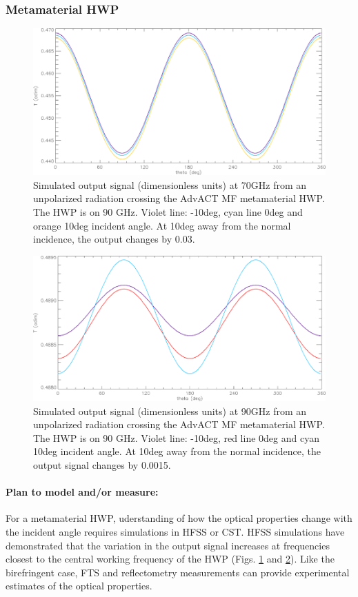 \subsubsection{Metamaterial HWP}

\begin{figure}
\centering
\includegraphics[width=0.6\linewidth]{figures/meta1.png}
\caption{Simulated output signal (dimensionless units) at 70GHz from an unpolarized radiation crossing the AdvACT MF metamaterial HWP. The HWP is %
on 90 GHz. Violet line: -10deg, cyan line 0deg and orange 10deg incident angle. At 10deg away from the normal incidence, the output %
changes by 0.03.}\label{meta1}
\end{figure}

\begin{figure}
\centering
\includegraphics[width=0.6\linewidth]{figures/meta2.png}
\caption{Simulated output signal (dimensionless units) at 90GHz from an unpolarized radiation crossing the AdvACT MF metamaterial HWP. The HWP is %
on 90 GHz. Violet line: -10deg, red line 0deg and cyan 10deg incident angle. At 10deg away from the normal incidence, the output signal
changes by 0.0015.}\label{meta2}
\end{figure}

\paragraph{Plan to model and/or measure:}
For a metamaterial HWP, uderstanding of how the optical properties change with the incident angle requires simulations in HFSS or CST. HFSS simulations have demonstrated that the variation in the output signal increases at frequencies closest to the central working frequency of the
HWP (Figs. \ref{meta1} and \ref{meta2}). 
Like the birefringent case, FTS and reflectometry measurements can provide experimental estimates of the optical properties.

